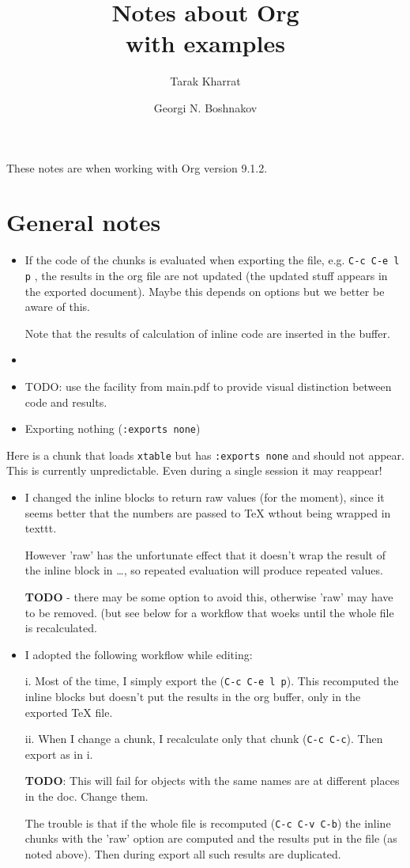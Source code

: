 \documentclass[a4paper,twoside,11pt]{article}
\author[1]{Tarak Kharrat}
\author[2]{Georgi N. Boshnakov}
\affil[1]{Salford Business School, University of Salford, UK.}
\affil[2]{School of Mathematics, University of Manchester, UK.}
\date{}
\title{Notes about Org\\\medskip
\large with examples}
\begin{document}
\maketitle
These notes are when working with Org version 9.1.2.

\section{General notes}
\label{sec:org27e96d4}

\begin{itemize}
\item If the code of the chunks is evaluated when exporting the file, e.g. \texttt{C-c C-e
  l p} , the results in the org file are not updated (the updated
stuff appears in the exported document). Maybe this depends on options but we
better be aware of this.

Note that the results of calculation of inline code are inserted in the
buffer.

\item 


\item TODO: use the facility from main.pdf to provide visual distinction between
code and results.

\item Exporting nothing (\texttt{:exports none})
\end{itemize}

Here is a chunk that loads \texttt{xtable} but has \texttt{:exports none} and should not
appear. 
This is currently unpredictable. Even during a single session it may reappear!

\begin{itemize}
\item I changed the inline blocks to return raw values (for the moment), since it
seems better that the numbers are passed to \TeX{} wthout being wrapped in
texttt. 

However 'raw' has the unfortunate effect that it doesn't wrap the result of
the inline block in \ldots{}, so repeated evaluation will produce
repeated values. 

\textbf{TODO} - there may be some option to avoid this, otherwise 'raw' may have to
be removed. (but see below for a workflow that woeks until the whole file is
recalculated.

\item I adopted the following workflow while editing:

i. Most of the time, I simply export the (\texttt{C-c C-e l p}). This recomputed the
inline blocks but doesn't put the results in the org buffer, only in the
exported \TeX{} file. 

ii. When I change a chunk, I recalculate only that chunk (\texttt{C-c C-c}).
 Then export as in i.

\textbf{TODO}: This will fail for objects with the same names are at different
places in the doc. Change them.

The trouble is that if the whole file is recomputed (\texttt{C-c C-v C-b}) 
the inline chunks with the 'raw' option are computed and the results put in
the file (as noted above). Then during export all such results are
duplicated.
\end{itemize}
\end{document}
